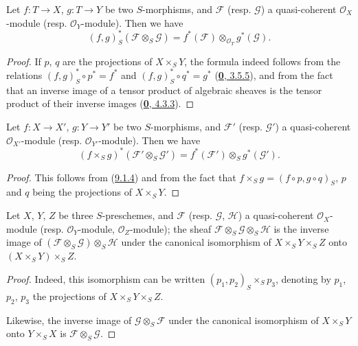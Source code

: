 \begin{proposition}[9.1.4]
\label{I.9.1.4}
Let $f:T\to X$, $g:T\to Y$ be two $S$-morphisms, and $\mathscr{F}$ \textup{(resp.
$\mathscr{G}$)} a quasi-coherent $\mathscr{O}_X$-module \textup{(resp.}
$\mathscr{O}_Y$-module). Then we have
\[
  (f,g)_S^*(\mathscr{F}\otimes_S\mathscr{G})
  =f^*(\mathscr{F})\otimes_{\mathscr{O}_T}g^*(\mathscr{G}).
\]
\end{proposition}

\begin{proof}
If $p$, $q$ are the projections of $X\times_S Y$, the formula indeed
follows from the relations $(f,g)_S^*\circ p^*=f^*$ and
$(f,g)_S^*\circ q^*=g^*$ (\hyperref[0.3.5.5]{\textbf{0}, 3.5.5}), and from the
fact that an inverse image of a tensor product of algebraic sheaves is
the tensor product of their inverse images
(\hyperref[0.4.3.3]{\textbf{0}, 4.3.3}).
\end{proof}

\begin{corollary}[9.1.5]
\label{I.9.1.5}
Let $f:X\to X'$, $g:Y\to Y'$ be two $S$-morphisms, and $\mathscr{F}'$
\textup{(resp. $\mathscr{G}'$)} a quasi-coherent $\mathscr{O}_{X'}$-module \textup{(resp.}
$\mathscr{O}_{Y'}$-module). Then we have
\[
  (f\times_S g)^*(\mathscr{F}'\otimes_S\mathscr{G}')
  =f^*(\mathscr{F}')\otimes_S g^*(\mathscr{G}').
\]
\end{corollary}

\begin{proof}
This follows from (\hyperref[I.9.1.4]{9.1.4}) and from the fact that
$f\times_S g=(f\circ p,g\circ q)_S$, $p$ and $q$ being the projections of
$X\times_S Y$.
\end{proof}

\begin{corollary}[9.1.6]
\label{I.9.1.6}
Let $X$, $Y$, $Z$ be three $S$-preschemes, and $\mathscr{F}$ \textup{(resp.
$\mathscr{G}$, $\mathscr{H}$)} a quasi-coherent $\mathscr{O}_X$-module
\textup{(resp.} $\mathscr{O}_Y$-module, $\mathscr{O}_Z$-module); the sheaf
$\mathscr{F}\otimes_S\mathscr{G}\otimes_S\mathscr{H}$ is the inverse image
of $(\mathscr{F}\otimes_S\mathscr{G})\otimes_S\mathscr{H}$ under the
canonical isomorphism of $X\times_S Y\times_S Z$ onto
$(X\times_S Y)\times_S Z$.
\end{corollary}

\begin{proof}
Indeed, this isomorphism can be written $(p_1,p_2)_S\times_S p_3$,
denoting by $p_1$, $p_2$, $p_3$ the projections of $X\times_S Y\times_S Z$.

Likewise, the inverse image of $\mathscr{G}\otimes_S\mathscr{F}$ under the
canonical isomorphism of $X\times_S Y$ onto $Y\times_S X$ is
$\mathscr{F}\otimes_S\mathscr{G}$.
\end{proof}

